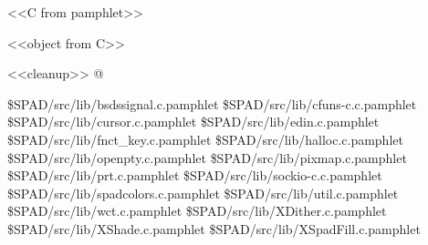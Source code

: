 \documentclass{article}
\begin{document}
<<C from pamphlet>>

<<object from C>>

<<cleanup>>
@

\eject
\begin{thebibliography}{99}
 {\$SPAD/src/lib/bsdssignal.c.pamphlet}
 {\$SPAD/src/lib/cfuns-c.c.pamphlet}
 {\$SPAD/src/lib/cursor.c.pamphlet}
 {\$SPAD/src/lib/edin.c.pamphlet}
 {\$SPAD/src/lib/fnct\_key.c.pamphlet}
 {\$SPAD/src/lib/halloc.c.pamphlet}
 {\$SPAD/src/lib/openpty.c.pamphlet}
 {\$SPAD/src/lib/pixmap.c.pamphlet}
 {\$SPAD/src/lib/prt.c.pamphlet}
 {\$SPAD/src/lib/sockio-c.c.pamphlet}
 {\$SPAD/src/lib/spadcolors.c.pamphlet}
 {\$SPAD/src/lib/util.c.pamphlet}
 {\$SPAD/src/lib/wct.c.pamphlet}
 {\$SPAD/src/lib/XDither.c.pamphlet}
 {\$SPAD/src/lib/XShade.c.pamphlet}
 {\$SPAD/src/lib/XSpadFill.c.pamphlet}
\end{thebibliography}
\end{document}
